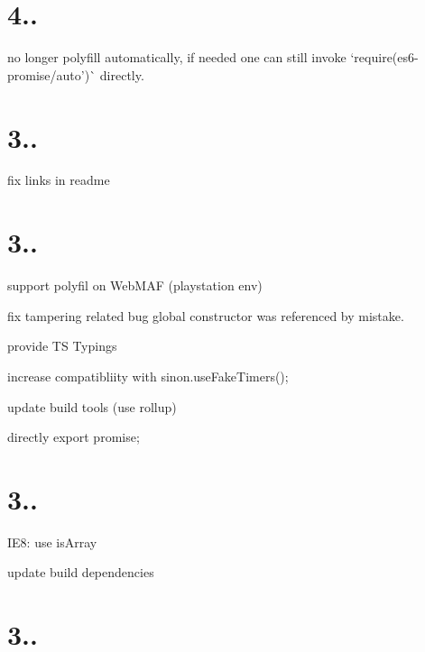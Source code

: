 \section*{4..}


\begin{DoxyItemize}
\item no longer polyfill automatically, if needed one can still invoke `require(\textquotesingle{}es6-\/promise/auto')\`{} directly.
\end{DoxyItemize}

\section*{3..}


\begin{DoxyItemize}
\item fix links in readme
\end{DoxyItemize}

\section*{3..}


\begin{DoxyItemize}
\item support polyfil on Web\+M\+AF (playstation env)
\item fix tampering related bug global {\ttfamily constructor} was referenced by mistake.
\item provide TS Typings
\item increase compatibliity with sinon.\+use\+Fake\+Timers();
\item update build tools (use rollup)
\item directly export promise;
\end{DoxyItemize}

\section*{3..}


\begin{DoxyItemize}
\item I\+E8\+: use is\+Array
\item update build dependencies
\end{DoxyItemize}

\section*{3..}


